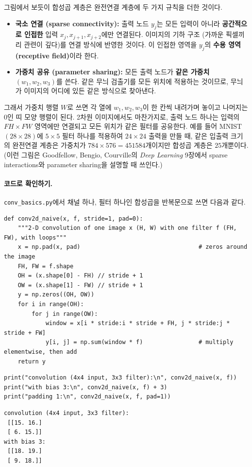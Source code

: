 \documentclass[11pt,a4paper]{article}
\begin{document}
그림에서 보듯이 합성곱 계층은 완전연결 계층에 두 가지 규칙을 더한 것이다.
\begin{itemize}[leftmargin=1.5em]
\item \textbf{국소 연결 (sparse connectivity):} 출력 노드 $y_j$는 모든 입력이 아니라 \textbf{공간적으로 인접한} 입력 $x_j,x_{j+1},x_{j+2}$에만 연결된다.
이미지의 기하 구조 (가까운 픽셀끼리 관련이 깊다)를 연결 방식에 반영한 것이다. 이 인접한 영역을 $y_j$의 \textbf{수용 영역(receptive field)}이라 한다.
\item \textbf{가중치 공유 (parameter sharing):} 모든 출력 노드가 \textbf{같은 가중치} $(w_1,w_2,w_3)$를 쓴다.
같은 무늬 검출기를 모든 위치에 적용하는 것이므로, 무늬가 이미지의 어디에 있든 같은 방식으로 찾아낸다.
\end{itemize}
그래서 가중치 행렬 $W$로 쓰면 각 열에 $w_1,w_2,w_3$이 한 칸씩 내려가며 놓이고 나머지는 $0$인 띠 모양 행렬이 된다.
2차원 이미지에서도 마찬가지로, 출력 노드 하나는 입력의 $FH\times FW$ 영역에만 연결되고 모든 위치가 같은 필터를 공유한다.
예를 들어 MNIST $(28\times28)$에 $5\times5$ 필터 하나를 적용하여 $24\times24$ 출력을 만들 때,
같은 입출력 크기의 완전연결 계층은 가중치가 $784\times576=451584$개이지만 합성곱 계층은 $25$개뿐이다.
(이런 그림은 Goodfellow, Bengio, Courville의 \emph{Deep Learning} 9장에서 sparse interactions와 parameter sharing을 설명할 때 쓰인다.)


\paragraph{코드로 확인하기.}
\texttt{conv\_basics.py}에서 채널 하나, 필터 하나인 합성곱을 반복문으로 쓰면 다음과 같다.
\begin{lstlisting}
def conv2d_naive(x, f, stride=1, pad=0):
    """2-D convolution of one image x (H, W) with one filter f (FH, FW), with loops"""
    x = np.pad(x, pad)                                  # zeros around the image
    FH, FW = f.shape
    OH = (x.shape[0] - FH) // stride + 1
    OW = (x.shape[1] - FW) // stride + 1
    y = np.zeros((OH, OW))
    for i in range(OH):
        for j in range(OW):
            window = x[i * stride:i * stride + FH, j * stride:j * stride + FW]
            y[i, j] = np.sum(window * f)                # multiply elementwise, then add
    return y
\end{lstlisting}
\begin{lstlisting}
print("convolution (4x4 input, 3x3 filter):\n", conv2d_naive(x, f))
print("with bias 3:\n", conv2d_naive(x, f) + 3)
print("padding 1:\n", conv2d_naive(x, f, pad=1))
\end{lstlisting}
\begin{lstlisting}[language={},numbers=none]
convolution (4x4 input, 3x3 filter):
 [[15. 16.]
 [ 6. 15.]]
with bias 3:
 [[18. 19.]
 [ 9. 18.]]
\end{lstlisting}
\end{document}
